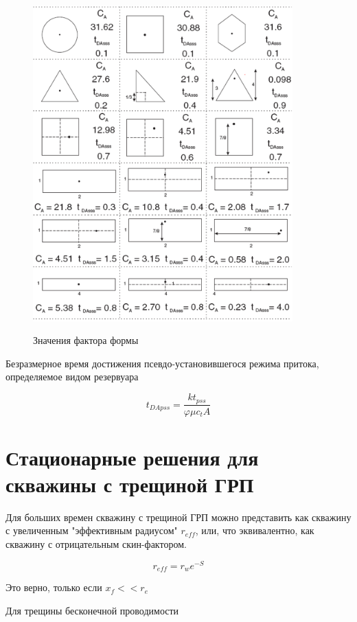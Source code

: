 \begin{figure}[h!]
	\centering
	\includegraphics[width= 10cm]{pics/shape_factors.png} 
	\label{fig:shape_factors}
	\caption{Значения фактора формы}
\end{figure}


Безразмерное время достижения псевдо-установившегося режима притока, определяемое видом резервуара

$$t_{DApss} = \frac{kt_{pss}}{\varphi \mu c_t A} $$

\section{Стационарные решения для скважины с трещиной ГРП}

Для больших времен скважину с трещиной ГРП можно представить как скважину с увеличенным "эффективным радиусом" $r_{eff}$, или, что эквивалентно, как скважину с отрицательным скин-фактором.

\begin{equation}
	r_{eff} = r_w e^{-S}
\end{equation}

Это верно, только если $x_f << r_e$

Для трещины бесконечной проводимости 

